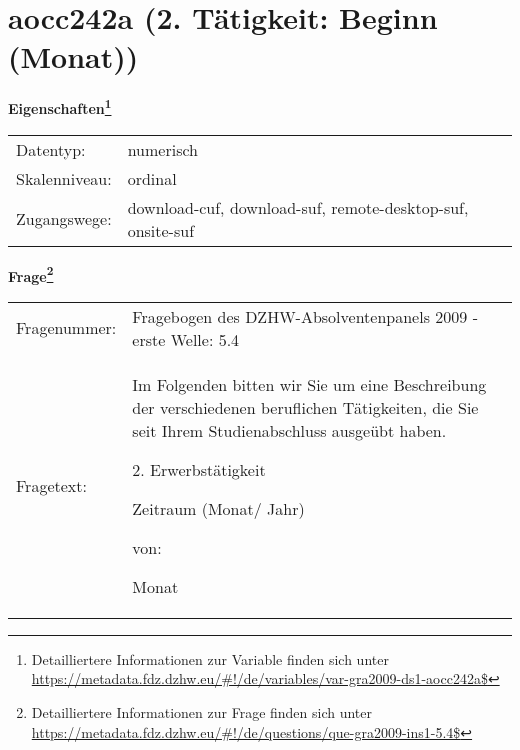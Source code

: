 
    \setcounter{footnote}{0}

    \vspace*{-1.8cm}
	\section{aocc242a (2. Tätigkeit: Beginn (Monat))}
	\label{section:aocc242a}



    \vspace*{0.5cm}
    \noindent\textbf{Eigenschaften\footnote{Detailliertere Informationen zur Variable finden sich unter
		\url{https://metadata.fdz.dzhw.eu/\#!/de/variables/var-gra2009-ds1-aocc242a$}}}\\
	\begin{tabularx}{\hsize}{@{}lX}
	Datentyp: & numerisch \\
	Skalenniveau: & ordinal \\
	Zugangswege: &
	  download-cuf, 
	  download-suf, 
	  remote-desktop-suf, 
	  onsite-suf
 \\
    \end{tabularx}



				\vspace*{0.5cm}
                \noindent\textbf{Frage\footnote{Detailliertere Informationen zur Frage finden sich unter
		              \url{https://metadata.fdz.dzhw.eu/\#!/de/questions/que-gra2009-ins1-5.4$}}}\\
				\begin{tabularx}{\hsize}{@{}lX}
					Fragenummer: &
					  Fragebogen des DZHW-Absolventenpanels 2009 - erste Welle:
					  5.4
 \\
					Fragetext: & Im Folgenden bitten wir Sie um eine Beschreibung der verschiedenen beruflichen Tätigkeiten, die Sie seit Ihrem Studienabschluss ausgeübt haben.\par  2. Erwerbstätigkeit\par  Zeitraum (Monat/ Jahr)\par  von:\par  Monat \\
				\end{tabularx}





